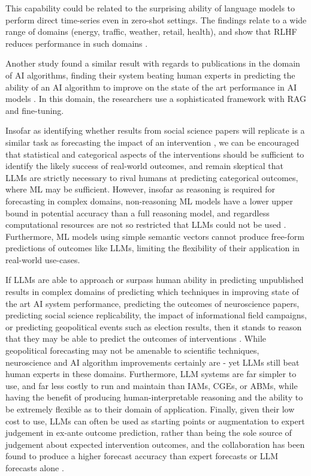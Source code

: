 \documentclass[12pt,a4paper]{article}
\begin{document}
This capability could be related to the surprising ability of language models to perform direct time-series even in zero-shot settings. The findings relate to a wide range of domains (energy, traffic, weather, retail, health), and show that RLHF reduces performance in such domains .

Another study found a similar result with regards to publications in the domain of AI algorithms, finding their system beating human experts in predicting the ability of an AI algorithm to improve on the state of the art performance in AI models . In this domain, the researchers use a sophisticated framework with RAG and fine-tuning.

Insofar as identifying whether results from social science papers will replicate is a similar task as forecasting the impact of an intervention \ABSTRACT, we can be encouraged that statistical and categorical aspects of the interventions should be sufficient to identify the likely success of real-world outcomes, and remain skeptical that LLMs are strictly necessary to rival humans at predicting categorical outcomes, where ML may be sufficient. However, insofar as reasoning is required for forecasting in complex domains, non-reasoning ML models have a lower upper bound in potential accuracy than a full reasoning model, and regardless computational resources are not so restricted that LLMs could not be used \ABSTRACT. Furthermore, ML models using simple semantic vectors cannot produce free-form predictions of outcomes like LLMs, limiting the flexibility of their application in real-world use-cases.

If LLMs are able to approach or surpass human ability in predicting unpublished results in complex domains of predicting which techniques in improving state of the art AI system performance, predicting the outcomes of neuroscience papers, predicting social science replicability, the impact of informational field campaigns, or predicting geopolitical events such as election results, then it stands to reason that they may be able to predict the outcomes of interventions \ABSTRACT. While geopolitical forecasting may not be amenable to scientific techniques, neuroscience and AI algorithm improvements certainly are - yet LLMs still beat human experts in these domains. Furthermore, LLM systems are far simpler to use, and far less costly to run and maintain than IAMs, CGEs, or ABMs, while having the benefit of producing human-interpretable reasoning and the ability to be extremely flexible as to their domain of application. Finally, given their low cost to use, LLMs can often be used as starting points or augmentation to expert judgement in ex-ante outcome prediction, rather than being the sole source of judgement about expected intervention outcomes, and the collaboration has been found to produce a higher forecast accuracy than expert forecasts or LLM forecasts alone .
\end{document}
